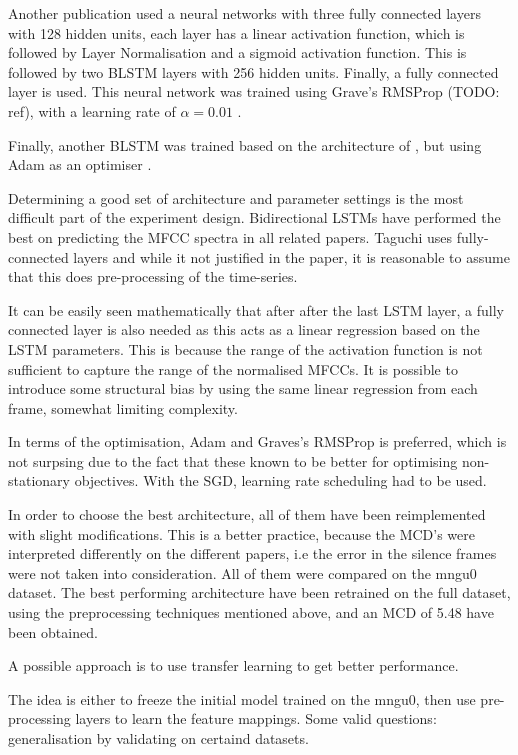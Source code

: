 \documentclass[a4paper]{article}
\begin{document}
Another publication \cite{Taguchi} used a neural networks with three fully
connected layers with 128 hidden units, each layer has a linear activation
function, which is followed by Layer Normalisation and a sigmoid activation
function. This is followed by two BLSTM layers with 256 hidden units. Finally,
a fully connected layer is used. This neural network was trained using Grave's RMSProp (TODO: ref),
with a learning rate of \( \alpha = 0.01 \) .

Finally, another BLSTM was trained based on the architecture of
\cite{Liu2018}, but using Adam as an optimiser \cite{Kingma2015}.

Determining a good set of architecture and parameter settings is the most difficult part of
the experiment design. Bidirectional LSTMs have performed the best on predicting the MFCC spectra in
all related papers. Taguchi uses fully-connected layers and while it not justified in the paper, it
is reasonable to assume that this does pre-processing of the time-series. 

It can be easily seen mathematically that after after the last LSTM layer, a fully connected layer is also needed as this acts as a linear regression based on the LSTM parameters. This is because the range of the activation function is not sufficient to capture the range of the normalised MFCCs. It is possible to introduce some structural bias by using the same linear regression from each frame, somewhat limiting complexity. 

In terms of the optimisation, Adam and Graves's RMSProp is preferred, which is not surpsing due to the
fact that these known to be better for optimising non-stationary objectives. With the SGD,
learning rate scheduling had to be used. 

In order to choose the best architecture, all of them have been reimplemented with slight modifications.
This is a better practice, because the MCD's were interpreted differently on the different papers, i.e the error in the silence frames were not taken into consideration. All of them were compared on the mngu0 dataset. The best performing architecture have been retrained on the full dataset, using the preprocessing techniques mentioned above, and an MCD of 5.48 have been obtained.


A possible approach is to use transfer learning to get better performance.

The idea is either to freeze the initial model trained on the mngu0, then use pre-processing
layers to learn the feature mappings. 
Some valid questions: generalisation by validating on certaind datasets.
\end{document}
